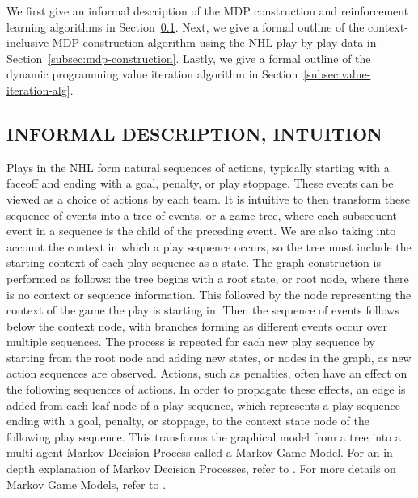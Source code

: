 \documentclass[]{article}
\begin{document}
We first give an informal description of the MDP construction and reinforcement learning algorithms in Section~\ref{subsec:informal-description}. Next, we give a formal outline of the context-inclusive MDP construction algorithm using the NHL play-by-play data in Section~\ref{subsec:mdp-construction}. Lastly, we give a formal outline of the dynamic programming value iteration algorithm in Section~\ref{subsec:value-iteration-alg}.


\subsection{INFORMAL DESCRIPTION, INTUITION}
\label{subsec:informal-description}

Plays in the NHL form natural sequences of actions, typically starting with a faceoff and ending with a goal, penalty, or play stoppage. These events can be viewed as a choice of actions by each team. It is intuitive to then transform these sequence of events into a tree of events, or a game tree, where each subsequent event in a sequence is the child of the preceding event. We are also taking into account the context in which a play sequence occurs, so the tree must include the starting context of each play sequence as a state. The graph construction is performed as follows: the tree begins with a root state, or root node, where there is no context or sequence information. This followed by the node representing the context of the game the play is starting in. Then the sequence of events follows below the context node, with branches forming as different events occur over multiple sequences. The process is repeated for each new play sequence by starting from the root node and adding new states, or nodes in the graph, as new action sequences are observed. Actions, such as penalties, often have an effect on the following sequences of actions. In order to propagate these effects, an edge is added from each leaf node of a play sequence, which represents a play sequence ending with a goal, penalty, or stoppage, to the context state node of the following play sequence. This transforms the graphical model from a tree into a multi-agent Markov Decision Process called a Markov Game Model. For an in-depth explanation of Markov Decision Processes, refer to \citep{Russell2010}. For more details on Markov Game Models, refer to \citep{Littman1994}.
\end{document}
